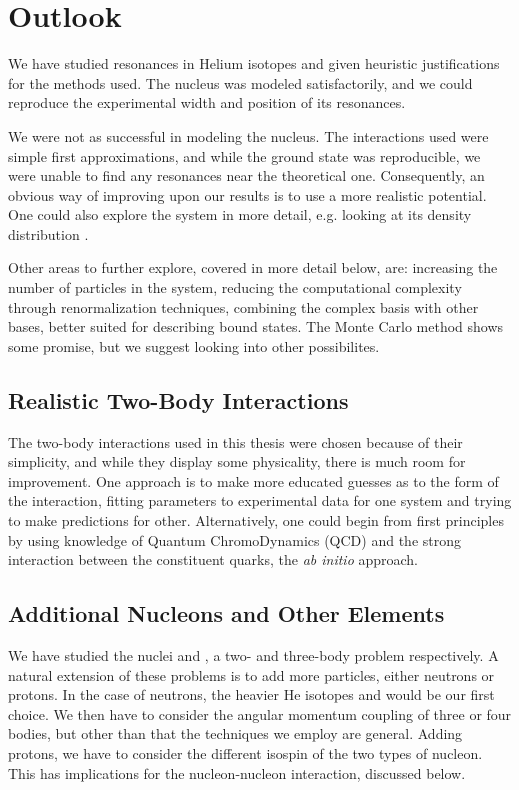 \documentclass[../main/report.tex]{subfiles}
\begin{document}
\chapter{Outlook}
\label{cha:outlook}


We have studied resonances in Helium isotopes and given heuristic justifications for the methods used. The  nucleus was modeled satisfactorily, and we could reproduce the experimental width and position of its resonances.

We were not as successful in modeling the  nucleus. The interactions used were simple first approximations, and while the ground state was reproducible, we were unable to find any resonances near the theoretical one. Consequently, an obvious way of improving upon our results is to use a more realistic potential. One could also explore the  system in more detail, e.g. looking at its density distribution \cite{radii}.

Other areas to further explore, covered in more detail below, are: increasing the number of particles in the system, reducing the computational complexity through renormalization techniques, combining the complex basis with other bases, better suited for describing bound states.
The Monte Carlo method shows some promise, but we suggest looking into other possibilites.

\section{Realistic Two-Body Interactions}
The two-body interactions used in this thesis were chosen because of their simplicity, and while they display some physicality, there is much room for improvement. 
One approach is to make more educated guesses as to the form of the interaction, fitting parameters to experimental data for one system and trying to make predictions for other.
Alternatively, one could begin from first principles by using knowledge of Quantum ChromoDynamics (QCD) and the strong interaction between the constituent quarks, the \emph{ab initio} approach.

\section{Additional Nucleons and Other Elements}

We have studied the nuclei  and , a two- and three-body problem respectively. 
A natural extension of these problems is to add more particles, either neutrons or protons.
In the case of neutrons, the heavier He isotopes  and  would be our first choice.
We then have to consider the angular momentum coupling of three or four bodies, but other than that the techniques we employ are general.
Adding protons, we have to consider the different isospin of the two types of nucleon.
This has implications for the nucleon-nucleon interaction, discussed below.
\end{document}
